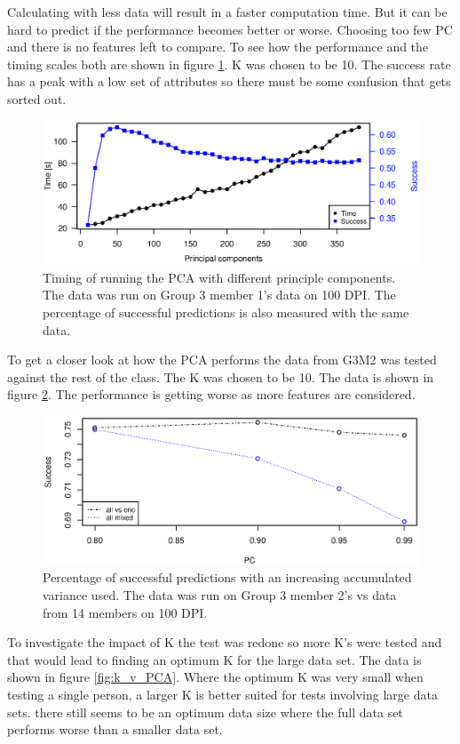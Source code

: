 Calculating with less data will result in a faster computation time. But it can be hard to predict if the performance becomes better or worse.
Choosing too few PC and there is no features left to compare.
To see how the performance and the timing scales both are shown in figure \ref{fig:pca_timing}. K was chosen to be 10.
The success rate has a peak with a low set of attributes so there must be some confusion that gets sorted out. 

\begin{figure}[h]
\centering
\includegraphics[width =0.8 \textwidth]{graphics/pca_timing_nikolaj}
\caption{Timing of running the PCA with different principle components. 
The data was run on Group 3 member 1's data on 100 DPI. 
The percentage of successful predictions is also measured with the same data.}
\label{fig:pca_timing}
\end{figure}

To get a closer look at how the PCA performs the data from G3M2 was tested against the rest of the class. 
The K was chosen to be 10. 
The data is shown in figure \ref{fig:pca_success}.
The performance is getting worse as more features are considered.

\begin{figure}[h]
\centering
\includegraphics[width =0.8 \textwidth]{graphics/pca_success}
\caption{Percentage of successful predictions with an increasing accumulated variance used.
The data was run on Group 3 member 2's vs data from 14 members on 100 DPI. }
\label{fig:pca_success}
\end{figure}

To investigate the impact of K the test was redone so more K's were tested and that would lead to finding an optimum K for the large data set.
The data is shown in figure \ref{fig:k_v_PCA}. 
Where the optimum K was very small when testing a single person, a larger K is better suited for tests involving large data sets.
there still seems to be an optimum data size where the full data set performs worse than a smaller data set. 

